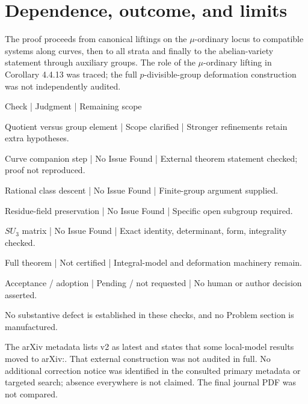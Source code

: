\documentclass[10pt]{article}
\begin{document}
\section*{Dependence, outcome, and limits}
The proof proceeds from canonical liftings on the \(\mu\)-ordinary locus to compatible systems along curves, then to all strata and finally to the abelian-variety statement through auxiliary groups. The role of the \(\mu\)-ordinary lifting in Corollary 4.4.13 was traced; the full \(p\)-divisible-group deformation construction was not independently audited.\par
Check | Judgment | Remaining scope\par
Quotient versus group element | Scope clarified | Stronger refinements retain extra hypotheses.\par
Curve companion step | No Issue Found | External theorem statement checked; proof not reproduced.\par
Rational class descent | No Issue Found | Finite-group argument supplied.\par
Residue-field preservation | No Issue Found | Specific open subgroup required.\par
\(SU_3\) matrix | No Issue Found | Exact identity, determinant, form, integrality checked.\par
Full theorem | Not certified | Integral-model and deformation machinery remain.\par
Acceptance / adoption | Pending / not requested | No human or author decision asserted.\par
No substantive defect is established in these checks, and no Problem section is manufactured.\par
The arXiv metadata lists v2 as latest and states that some local-model results moved to arXiv:. That external construction was not audited in full. No additional correction notice was identified in the consulted primary metadata or targeted search; absence everywhere is not claimed. The final journal PDF was not compared.\par
\end{document}
